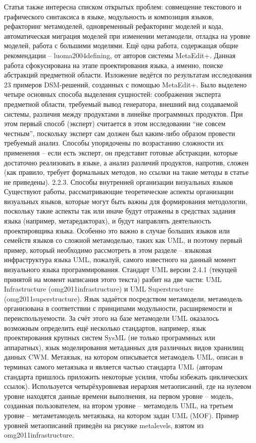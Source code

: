 	Статья также интересна списком открытых проблем: совмещение текстового и графического синтаксиса в языке, модульность и композиция языков, рефакторинг метамоделей, одновременный рефакторинг моделей и кода, автоматическая миграция моделей при изменении метамодели, отладка на уровне моделей, работа с большими моделями.
	Ещё одна работа, содержащая общие рекомендации – luoma2004defining, от авторов системы MetaEdit+. Данная работа сфокусирована на этапе проектирования языка, а именно, поиске абстракций предметной области. Изложение ведётся по результатам исследования 23 примеров DSM-решений, созданных с помощью MetaEdit+. Было выделено четыре основных способа выделения сущностей: соображения эксперта предметной области, требуемый вывод генератора, внешний вид создаваемой системы, различия между продуктами в линейке программных продуктов. При этом первый способ (эксперт) считается в этом исследовании “не совсем честным”, поскольку эксперт сам должен был каким-либо образом провести требуемый анализ. Способы упорядочены по возрастанию сложности их применения – если есть эксперт, он представит готовые абстракции, которые достаточно реализовать в языке, а анализ различий продуктов, напротив, сложен (как правило, требует формальных методов, но ссылки на такие методы в статье не приведены).
2.2.3. Способы внутренней организации визуальных языков
	Существуют работы, рассматривающие теоретические аспекты организации визуальных языков, которые могут быть важны для формирования методологии, поскольку такие аспекты так или иначе будут отражены в средствах задания языка (например, метаредакторах), и будут направлять деятельность проектировщика языка. Особенно это важно в случае больших языков или семейств языков со сложной метамоделью, таких как UML, и поэтому первый пример, который необходимо рассмотреть в этом разделе – языковая инфраструктура языка UML, пожалуй, самого известного на данный момент визуального языка программирования.
	Стандарт UML версии 2.4.1 (текущей принятой на момент написания этого текста) разбит на две части: UML Infrastructure (omg2011infrastructure) и UML Superstructure (omg2011superstructure). Язык задаётся посредством метамодели, метамодель организована в соответствии с принципами модульности, расширяемости и переиспользуемости. За счёт этого на базе метамодели UML оказалось возможным определить ещё несколько стандартов, например, язык проектирования крупных систем SysML (не только программных или аппаратных), язык моделирования метаданных для различных видов хранилищ данных CWM. Метаязык, на котором описывается метамодель UML, описан в терминах самого метаязыка и является частью стандарта UML (авторам стандарта пришлось приложить некоторые усилия, чтобы избежать циклических ссылок). Используется четырёхуровневая иерархия метаописаний, где на нулевом уровне находятся данные времени выполнения, на первом уровне – модель, созданная пользователем, на втором уровне – метамодель UML, на третьем уровне – метаметамодель метаязыка, на котором задан UML (MOF). Пример уровней метаописаний приведён на рисунке metalevels, взятом из omg2011infrastructure.
